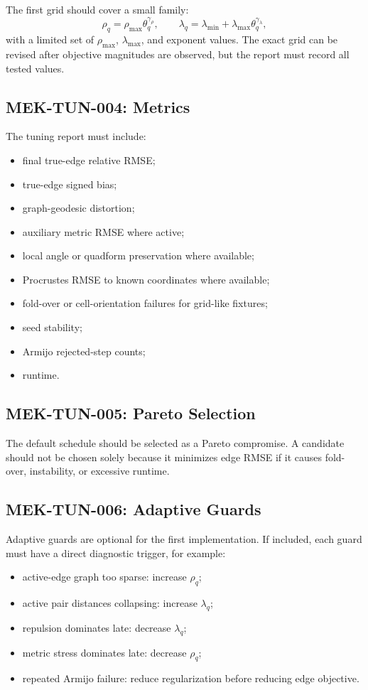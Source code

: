 \documentclass[11pt]{article}
\begin{document}
The first grid should cover a small family:
\[
  \rho_q = \rho_{\max}\theta_q^{\gamma_\rho},
  \qquad
  \lambda_q = \lambda_{\min}+\lambda_{\max}\theta_q^{\gamma_\lambda},
\]
with a limited set of \(\rho_{\max}\), \(\lambda_{\max}\), and exponent values.
The exact grid can be revised after objective magnitudes are observed, but the
report must record all tested values.

\subsection{MEK-TUN-004: Metrics}

The tuning report must include:
\begin{itemize}[leftmargin=2em]
  \item final true-edge relative RMSE;
  \item true-edge signed bias;
  \item graph-geodesic distortion;
  \item auxiliary metric RMSE where active;
  \item local angle or quadform preservation where available;
  \item Procrustes RMSE to known coordinates where available;
  \item fold-over or cell-orientation failures for grid-like fixtures;
  \item seed stability;
  \item Armijo rejected-step counts;
  \item runtime.
\end{itemize}

\subsection{MEK-TUN-005: Pareto Selection}

The default schedule should be selected as a Pareto compromise. A candidate
should not be chosen solely because it minimizes edge RMSE if it causes
fold-over, instability, or excessive runtime.

\subsection{MEK-TUN-006: Adaptive Guards}

Adaptive guards are optional for the first implementation. If included, each
guard must have a direct diagnostic trigger, for example:
\begin{itemize}[leftmargin=2em]
  \item active-edge graph too sparse: increase \(\rho_q\);
  \item active pair distances collapsing: increase \(\lambda_q\);
  \item repulsion dominates late: decrease \(\lambda_q\);
  \item metric stress dominates late: decrease \(\rho_q\);
  \item repeated Armijo failure: reduce regularization before reducing edge
  objective.
\end{itemize}
\end{document}
